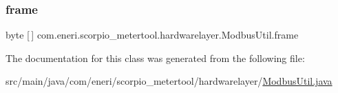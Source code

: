 \subsubsection{\texorpdfstring{frame}{frame}}
{\footnotesize\ttfamily byte \mbox{[}$\,$\mbox{]} com.\+eneri.\+scorpio\+\_\+metertool.\+hardwarelayer.\+Modbus\+Util.\+frame}



The documentation for this class was generated from the following file\+:\begin{DoxyCompactItemize}
\item 
src/main/java/com/eneri/scorpio\+\_\+metertool/hardwarelayer/\hyperlink{_modbus_util_8java}{Modbus\+Util.\+java}\end{DoxyCompactItemize}

